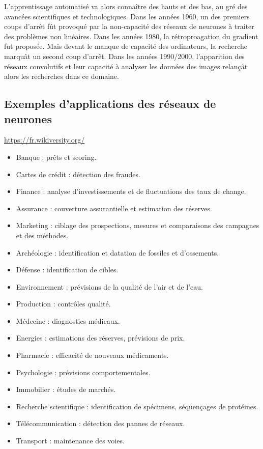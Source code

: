 L'apprentissage automatisé va alors connaître des hauts et des bas, au gré des avancées scientifiques et technologiques. Dans les années 1960, un des premiers coups d'arrêt fût provoqué par la non-capacité des réseaux de neurones à traiter des problèmes non linéaires. Dans les années 1980, la rétroproagation du gradient fut proposée. Mais devant le manque de capacité des ordinateurs, la recherche marquât un second coup d'arrêt. Dans les années 1990/2000, l'apparition des réseaux convolutifs et leur capacité à analyser les données des images relançât alors les recherches dans ce domaine.

\subsection{Exemples d'applications des réseaux de neurones}
\url{https://fr.wikiversity.org/}
\begin{itemize}
\item Banque	 : prêts et scoring.
\item Cartes de crédit	: détection des fraudes.
\item Finance	 : analyse d'investissements et de fluctuations des taux de change.
\item Assurance : couverture assurantielle et estimation des réserves.
\item Marketing : ciblage des prospections, mesures et comparaisons des campagnes et des méthodes.
\item Archéologie	 : identification et datation de fossiles et d'ossements.
\item Défense : identification de cibles.
\item Environnement : prévisions de la qualité de l'air et de l'eau.
\item Production : contrôles qualité.
\item Médecine : diagnostics médicaux.
\item Energies : estimations des réserves, prévisions de prix.
\item Pharmacie : efficacité de nouveaux médicaments.
\item Psychologie	: prévisions comportementales.
\item Immobilier : études de marchés.
\item Recherche scientifique : identification de spécimens, séquençages de protéines.
\item Télécommunication : détection des pannes de réseaux.
\item Transport : maintenance des voies.
\end{itemize}

